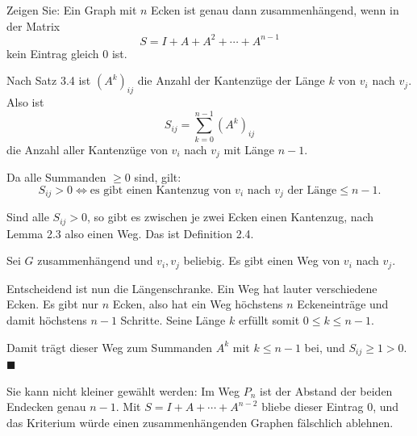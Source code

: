 \begin{aufgabe}
\begin{center}
\begin{minipage}{0.86\textwidth}
\end{minipage}
\end{center}
\end{aufgabe}

\begin{aufgabe}
Zeigen Sie: Ein Graph mit $n$ Ecken ist genau dann zusammenhängend, wenn in der Matrix
\[ S = I + A + A^2 + \cdots + A^{n-1} \]
kein Eintrag gleich $0$ ist.

\loesung
{}
Nach Satz 3.4 ist $(A^k)_{ij}$ die Anzahl der Kantenzüge der Länge $k$ von $v_i$ nach $v_j$. Also ist
\[ S_{ij} = \sum_{k=0}^{n-1} (A^k)_{ij} \]
die Anzahl aller Kantenzüge von $v_i$ nach $v_j$ mit Länge  $n-1$.

Da alle Summanden $\ge 0$ sind, gilt:
\[ S_{ij} > 0 \iff \text{es gibt einen Kantenzug von } v_i \text{ nach } v_j \text{ der Länge} \le n-1 . \]

Sind alle $S_{ij} > 0$, so gibt es zwischen je zwei Ecken einen Kantenzug, nach Lemma 2.3 also einen Weg. Das ist Definition 2.4.

Sei $G$ zusammenhängend und $v_i, v_j$ beliebig. Es gibt einen Weg von $v_i$ nach $v_j$.

Entscheidend ist nun die Längenschranke. Ein Weg hat lauter verschiedene Ecken. Es gibt nur $n$ Ecken, also hat ein Weg höchstens $n$ Eckeneinträge und damit höchstens $n-1$ Schritte. Seine Länge $k$ erfüllt somit $0 \le k \le n-1$.

Damit trägt dieser Weg zum Summanden $A^k$ mit $k \le n-1$ bei, und $S_{ij} \ge 1 > 0$. $\blacksquare$

Sie kann nicht kleiner gewählt werden: Im Weg $P_n$ ist der Abstand der beiden Endecken genau $n-1$. Mit $S = I + A + \cdots + A^{n-2}$ bliebe dieser Eintrag $0$, und das Kriterium würde einen zusammenhängenden Graphen fälschlich ablehnen.
\end{aufgabe}


